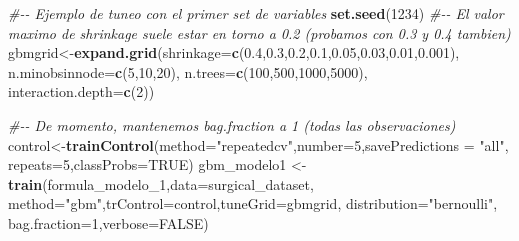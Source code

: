 \documentclass[
]{article}
\newenvironment{Shaded}{\begin{snugshade}}{\end{snugshade}}
\newcommand{\CommentTok}[1]{\textcolor[rgb]{0.56,0.35,0.01}{\textit{#1}}}
\newcommand{\DataTypeTok}[1]{\textcolor[rgb]{0.13,0.29,0.53}{#1}}
\newcommand{\DecValTok}[1]{\textcolor[rgb]{0.00,0.00,0.81}{#1}}
\newcommand{\FloatTok}[1]{\textcolor[rgb]{0.00,0.00,0.81}{#1}}
\newcommand{\KeywordTok}[1]{\textcolor[rgb]{0.13,0.29,0.53}{\textbf{#1}}}
\newcommand{\NormalTok}[1]{#1}
\newcommand{\OtherTok}[1]{\textcolor[rgb]{0.56,0.35,0.01}{#1}}
\newcommand{\StringTok}[1]{\textcolor[rgb]{0.31,0.60,0.02}{#1}}
\begin{document}
\begin{Shaded}
\begin{Highlighting}[]
\CommentTok{\#{-}{-} Ejemplo de tuneo con el primer set de variables}
\KeywordTok{set.seed}\NormalTok{(}\DecValTok{1234}\NormalTok{)}
\CommentTok{\#{-}{-} El valor maximo de shrinkage suele estar en torno a 0.2 (probamos con 0.3 y 0.4 tambien)}
\NormalTok{gbmgrid<{-}}\KeywordTok{expand.grid}\NormalTok{(}\DataTypeTok{shrinkage=}\KeywordTok{c}\NormalTok{(}\FloatTok{0.4}\NormalTok{,}\FloatTok{0.3}\NormalTok{,}\FloatTok{0.2}\NormalTok{,}\FloatTok{0.1}\NormalTok{,}\FloatTok{0.05}\NormalTok{,}\FloatTok{0.03}\NormalTok{,}\FloatTok{0.01}\NormalTok{,}\FloatTok{0.001}\NormalTok{),}
                     \DataTypeTok{n.minobsinnode=}\KeywordTok{c}\NormalTok{(}\DecValTok{5}\NormalTok{,}\DecValTok{10}\NormalTok{,}\DecValTok{20}\NormalTok{),}
                     \DataTypeTok{n.trees=}\KeywordTok{c}\NormalTok{(}\DecValTok{100}\NormalTok{,}\DecValTok{500}\NormalTok{,}\DecValTok{1000}\NormalTok{,}\DecValTok{5000}\NormalTok{),}
                     \DataTypeTok{interaction.depth=}\KeywordTok{c}\NormalTok{(}\DecValTok{2}\NormalTok{))}

\CommentTok{\#{-}{-} De momento, mantenemos bag.fraction a 1 (todas las observaciones)}
\NormalTok{control<{-}}\KeywordTok{trainControl}\NormalTok{(}\DataTypeTok{method=}\StringTok{"repeatedcv"}\NormalTok{,}\DataTypeTok{number=}\DecValTok{5}\NormalTok{,}\DataTypeTok{savePredictions =} \StringTok{"all"}\NormalTok{, }
                      \DataTypeTok{repeats=}\DecValTok{5}\NormalTok{,}\DataTypeTok{classProbs=}\OtherTok{TRUE}\NormalTok{)}
\NormalTok{gbm\_modelo1 <{-}}\StringTok{ }\KeywordTok{train}\NormalTok{(formula\_modelo\_}\DecValTok{1}\NormalTok{,}\DataTypeTok{data=}\NormalTok{surgical\_dataset,}
                     \DataTypeTok{method=}\StringTok{"gbm"}\NormalTok{,}\DataTypeTok{trControl=}\NormalTok{control,}\DataTypeTok{tuneGrid=}\NormalTok{gbmgrid,}
                     \DataTypeTok{distribution=}\StringTok{"bernoulli"}\NormalTok{, }\DataTypeTok{bag.fraction=}\DecValTok{1}\NormalTok{,}\DataTypeTok{verbose=}\OtherTok{FALSE}\NormalTok{)}
\end{Highlighting}
\end{Shaded}
\end{document}

